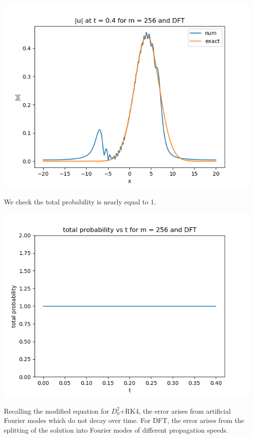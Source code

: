 \documentclass{article}
\begin{document}
\begin{enumerate}[label=(\alph*)]
\begin{center}
	\includegraphics[scale=.3]{FINAL u_abs t = 0.4 m = 256 DFT}
\end{center}
We check the total probability is nearly equal to 1.
\begin{center}
	\includegraphics[scale=.5]{FINAL prob m = 256 DFT}
\end{center}

Recalling the modified equation for $D_0^2$+RK4, the error arises from artificial Fourier modes which do not decay over time. For DFT, the error arises from the splitting of the solution into Fourier modes of different propagation speeds.
	
\end{enumerate}
\end{document}
